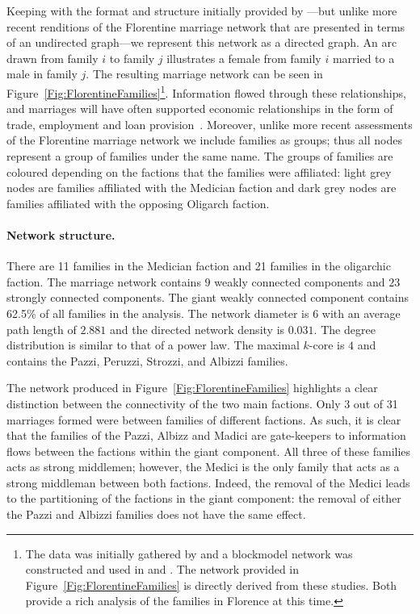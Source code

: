 \documentclass[11pt,fleqn]{article}
\begin{document}
Keeping with the format and structure initially provided by \citet[p.~1276--77]{Padgett1993}---but unlike more recent renditions of the Florentine marriage network that are presented in terms of an undirected graph---we represent this network as a directed graph. An arc drawn from family $i$ to family $j$ illustrates a female from family $i$ married to a male in family $j$. The resulting marriage network can be seen in Figure~\ref{Fig:FlorentineFamilies}\footnote{The data was initially gathered by \citet{Kent1978} and a blockmodel network was constructed and used in \citet{Padgett1993} and \citet{Padgett1994}. The network provided in Figure~\ref{Fig:FlorentineFamilies} is directly derived from these studies. Both provide a rich analysis of the families in Florence at this time.}. Information flowed through these relationships, and marriages will have often supported economic relationships in the form of trade, employment and loan provision~\citep{Kent2009}. Moreover, unlike more recent assessments of the Florentine marriage network we include families as groups; thus all nodes represent a group of families under the same name. The groups of families are coloured depending on the factions that the families were affiliated: light grey nodes are families affiliated with the Medician faction and dark grey nodes are families affiliated with the opposing Oligarch faction.

\paragraph{Network structure.}

There are 11 families in the Medician faction and 21 families in the oligarchic faction. The marriage network contains $9$ weakly connected components and $23$ strongly connected components. The giant weakly connected component contains 62.5\% of all families in the analysis. The network diameter is $6$ with an average path length of $2.881$ and the directed network density is $0.031$. The degree distribution is similar to that of a power law. The maximal $k$-core is $4$ and contains the Pazzi, Peruzzi, Strozzi, and Albizzi families.

The network produced in Figure~\ref{Fig:FlorentineFamilies} highlights a clear distinction between the connectivity of the two main factions. Only 3 out of 31 marriages formed were between families of different factions. As such, it is clear that the families of the Pazzi, Albizz and Madici are gate-keepers to information flows between the factions within the giant component. All three of these families acts as strong middlemen; however, the Medici is the only family that acts as a strong middleman between both factions. Indeed, the removal of the Medici leads to the partitioning of the factions in the giant component: the removal of either the Pazzi and Albizzi families does not have the same effect.
\end{document}
